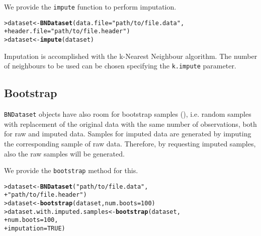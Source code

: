 \documentclass{article}\usepackage[]{graphicx}\usepackage[]{color}
\makeatletter
\newcommand{\hlnum}[1]{\textcolor[rgb]{0.686,0.059,0.569}{#1}}%
\newcommand{\hlstr}[1]{\textcolor[rgb]{0.192,0.494,0.8}{#1}}%
\newcommand{\hlstd}[1]{\textcolor[rgb]{0.345,0.345,0.345}{#1}}%
\newcommand{\hlkwb}[1]{\textcolor[rgb]{0.69,0.353,0.396}{#1}}%
\newcommand{\hlkwc}[1]{\textcolor[rgb]{0.333,0.667,0.333}{#1}}%
\newcommand{\hlkwd}[1]{\textcolor[rgb]{0.737,0.353,0.396}{\textbf{#1}}}%
\newenvironment{kframe}{%
 \def\at@end@of@kframe{}%
 \ifinner\ifhmode%
  \def\at@end@of@kframe{\end{minipage}}%
  \begin{minipage}{\columnwidth}%
 \fi\fi%
 \def\FrameCommand##1{\hskip\@totalleftmargin \hskip-\fboxsep
 \colorbox{shadecolor}{##1}\hskip-\fboxsep
     \hskip-\linewidth \hskip-\@totalleftmargin \hskip\columnwidth}%
 \MakeFramed {\advance\hsize-\width
   \@totalleftmargin\z@ \linewidth\hsize
   \@setminipage}}%
 {\par\unskip\endMakeFramed%
 \at@end@of@kframe}
\newenvironment{knitrout}{}{} %
\newcommand{\Robject}[1]{{\texttt{#1}}}
\newcommand{\Rmethod}[1]{{\texttt{#1}}}
\newcommand{\Rfunarg}[1]{{\texttt{#1}}}
\makeatother
\begin{document}
We provide the \Rmethod{impute} function to perform imputation.
\begin{knitrout}
\color{fgcolor}\begin{kframe}
\begin{alltt}
\hlstd{> }\hlstd{dataset} \hlkwb{<-} \hlkwd{BNDataset}\hlstd{(}\hlkwc{data.file}   \hlstd{=} \hlstr{"path/to/file.data"}\hlstd{,}
\hlstd{+ }                     \hlkwc{header.file} \hlstd{=} \hlstr{"path/to/file.header"}\hlstd{)}
\hlstd{> }\hlstd{dataset} \hlkwb{<-} \hlkwd{impute}\hlstd{(dataset)}
\end{alltt}
\end{kframe}
\end{knitrout}

Imputation is accomplished with the k-Nearest Neighbour algorithm. The number of neighbours to be used
can be chosen specifying the \Rfunarg{k.impute} parameter.


\subsection{Bootstrap}
\Robject{BNDataset} objects have also room for bootstrap samples (\citet{efron1994introduction}), i.e. random samples with replacement of the original data
with the same number of observations, both for raw and imputed data.
Samples for imputed data are generated by imputing the corresponding sample of raw data.
Therefore, by requesting imputed samples, also the raw samples will be generated.

We provide the \Rmethod{bootstrap} method for this.
\begin{knitrout}
\color{fgcolor}\begin{kframe}
\begin{alltt}
\hlstd{> }\hlstd{dataset} \hlkwb{<-} \hlkwd{BNDataset}\hlstd{(}\hlstr{"path/to/file.data"}\hlstd{,}
\hlstd{+ }                     \hlstr{"path/to/file.header"}\hlstd{)}
\hlstd{> }\hlstd{dataset} \hlkwb{<-} \hlkwd{bootstrap}\hlstd{(dataset,} \hlkwc{num.boots} \hlstd{=} \hlnum{100}\hlstd{)}
\hlstd{> }\hlstd{dataset.with.imputed.samples} \hlkwb{<-} \hlkwd{bootstrap}\hlstd{(dataset,}
\hlstd{+ }                                          \hlkwc{num.boots} \hlstd{=} \hlnum{100}\hlstd{,}
\hlstd{+ }                                          \hlkwc{imputation} \hlstd{=} \hlnum{TRUE}\hlstd{)}
\end{alltt}
\end{kframe}
\end{knitrout}
\end{document}
